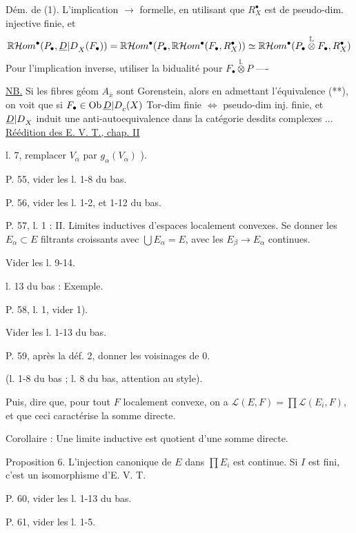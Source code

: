 Dém. de (1). L'implication $\longrightarrow$ formelle, en utilisant que $R_X^{\bullet}$ est de pseudo-dim. injective finie, et
\[
\mathbb{R}\mathcal{H}om^{\bullet}(P_\bullet,{\underline{D}|D}_X(F_\bullet))
=\mathbb{R}\mathcal{H}om^{\bullet}(P_\bullet,\mathbb{R}\mathcal{H}om^{\bullet}(F_\bullet,R_X^{\bullet}))
\simeq\mathbb{R}\mathcal{H}om^{\bullet}(P_\bullet\overset{\mathbb L}{\otimes}F_\bullet,R_X^{\bullet})
\]
Pour l'implication inverse, utiliser la bidualité pour $F_\bullet\overset{\mathbb L}{\otimes}P$ ----

\uline{NB.} Si les fibres géom $A_{\bar{x}}$ sont Gorenstein, alors en admettant l'équivalence (**), on voit que si $F_\bullet\in\operatorname{Ob}{\underline{D}|D}_c(X)$ Tor-dim finie $\Longleftrightarrow$ pseudo-dim inj. finie, et ${\underline{D}|D}_X$ induit une anti-autoequivalence dans la catégorie desdits complexes ...
\uline{Réédition des E. V. T., chap. II} 

l. 7, remplacer $V_\alpha$ par $g_\alpha(V_\alpha)$ ).

P. 55, vider les l. 1-8 du bas.

P. 56, vider les l. 1-2, et 1-12 du bas.

P. 57, l. 1 : II. Limites inductives d'espaces localement convexes. Se donner les $E_\alpha\subset E$ filtrants croissants avec $\bigcup E_\alpha=E$, avec les $E_\beta\longrightarrow E_\alpha$ continues.

Vider les l. 9-14.

l. 13 du bas : Exemple.

P. 58, l. 1, vider 1).

Vider les l. 1-13 du bas.

P. 59, après la déf. 2, donner les voisinages de 0.

(l. 1-8 du bas ; l. 8 du bas, attention au style).

Puis, dire que, pour tout $F$ localement convexe, on a $\mathcal{L}(E,F)=\prod\mathcal{L}(E_i,F)$, et que ceci caractérise la somme directe.

Corollaire : Une limite inductive est quotient d'une somme directe.

Proposition 6. L'injection canonique de $E$ dans $\prod E_i$ est continue. Si $I$ est fini, c'est un isomorphisme d'E. V. T.

P. 60, vider les l. 1-13 du bas.

P. 61, vider les l. 1-5.

